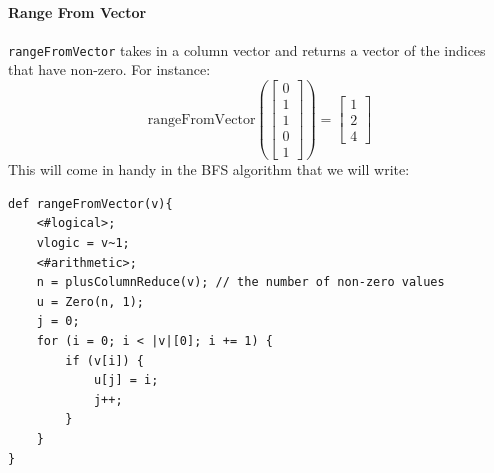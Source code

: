 \paragraph{Range From Vector}
\verb=rangeFromVector= takes in a column vector and returns a vector of the indices that have non-zero.  For instance:
$$\text{rangeFromVector}(\begin{bmatrix}
0 \\ 1 \\ 1 \\ 0 \\ 1
\end{bmatrix})
=
\begin{bmatrix}
1\\2\\4
\end{bmatrix}
$$
This will come in handy in the BFS algorithm that we will write:
\begin{lstlisting}
def rangeFromVector(v){
    <#logical>;
    vlogic = v~1;
    <#arithmetic>;
    n = plusColumnReduce(v); // the number of non-zero values
    u = Zero(n, 1);
    j = 0;
    for (i = 0; i < |v|[0]; i += 1) {
        if (v[i]) {
            u[j] = i;
            j++;
        }
    }
}
\end{lstlisting}



